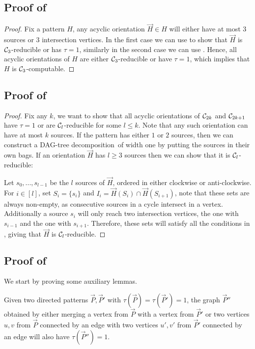 \documentclass[a4paper,UKenglish,cleveref, autoref, numberwithinsect, thm-restate]{lipics-v2021}
\newcommand{\reducible}[1]{${#1}$-reducible}
\newcommand{\computable}[1]{${#1}$-computable}
\newcommand{\cycle}[1]{\cC_{#1}}
\newcommand{\dtw}{\tau}
\newcommand{\dagtree}{DAG-tree decomposition}
\newcommand{\cC}{{\cal C}}
\begin{document}
	\subsection{Proof of }
	\sixseven*	
	\begin{proof}
		Fix a pattern $H$, any acyclic orientation $\vec{H} \in H$ will either have at most $3$ sources or $3$ intersection vertices. In the first case we can use  to show that $\vec{H}$ is \reducible{\cycle{3}} or has $\dtw=1$, similarly in the second case we can use . Hence, all acyclic orientations of $H$ are either \reducible{\cycle{3}} or have $\dtw=1$, which implies that $H$ is \computable{\cycle{3}}.
	\end{proof}

	\subsection{Proof of }
	\cyclehom*
	\begin{proof}
		Fix any $k$, we want to show that all acyclic orientations of $\cycle{2k}$ and $\cycle{2k+1}$ have $\dtw=1$ or are \reducible{\cycle{l}} for some $l \leq k$. Note that any such orientation can have at most $k$ sources. If the pattern has either $1$ or $2$ sources, then we can construct a \dagtree\ of width one by putting the sources in their own bags. If an orientation $\vec{H}$ has $l \geq 3$ sources then we can show that it is \reducible{\cycle{l}}:
		
		Let $s_0,...,s_{l-1}$ be the $l$ sources of $\vec{H}$, ordered in either clockwise or anti-clockwise. For $i \in [l]$, set $S_i = \{s_i\}$ and $I_i = \vec{H}(S_i) \cap \vec{H}(S_{i+1})$, note that these sets are always non-empty, as consecutive sources in a cycle intersect in a vertex. Additionally a source $s_i$ will only reach two intersection vertices, the one with $s_{i-1}$ and the one with $s_{i+1}$. Therefore, these sets will satisfy all the conditions in , giving that $\vec{H}$ is \reducible{\cycle{l}}.
	\end{proof}

	\subsection{Proof of }
	
	We start by proving some auxiliary lemmas.
	
		\begin{lemma} \label{lem:merge}
		Given two directed patterns $\vec{P},\vec{P}'$ with $\dtw(\vec{P}) = \dtw(\vec{P}') = 1$, the graph $\vec{P}''$ obtained by either merging a vertex from $\vec{P}$ with a vertex from $\vec{P}'$ or two vertices $u,v$ from $\vec{P}$ connected by an edge with two vertices $u',v'$ from $\vec{P}'$ connected by an edge will also have $\dtw(\vec{P}'') = 1$.
	\end{lemma}
	
\end{document}
